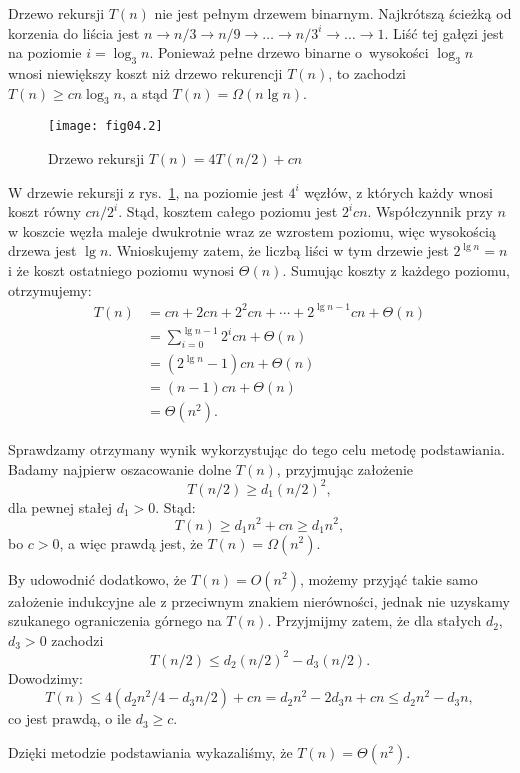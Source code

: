 \exercise{} %
\noindent Drzewo rekursji $T(n)$ nie jest pełnym drzewem binarnym. Najkrótszą ścieżką od korzenia do liścia jest $n\to n/3\to n/9\to\dots\to n/3^i\to\dots\to1$. Liść tej gałęzi jest na poziomie $i=\log_3n$. Ponieważ pełne drzewo binarne o~wysokości $\log_3n$ wnosi niewiększy koszt niż drzewo rekurencji $T(n)$, to zachodzi $T(n)\ge cn\log_3n$, a stąd $T(n)=\Omega(n\lg n)$.

\exercise{} %
\begin{figure}[ht]
	\begin{center}
		\texttt{[image: fig04.2]}
	\end{center}
	\caption{Drzewo rekursji $T(n)=4T(n/2)+cn$} \label{fig:4.2-3}
\end{figure}

\noindent W drzewie rekursji z rys.~\ref{fig:4.2-3}, na  poziomie jest $4^i$ węzłów, z których każdy wnosi koszt równy $cn/2^i$. Stąd, kosztem całego poziomu jest $2^icn$. Współczynnik przy $n$ w koszcie węzła maleje dwukrotnie wraz ze wzrostem poziomu, więc wysokością drzewa jest $\lg n$. Wnioskujemy zatem, że liczbą liści w tym drzewie jest $2^{\lg n}=n$ i że koszt ostatniego poziomu wynosi $\Theta(n)$. Sumując koszty z każdego poziomu, otrzymujemy:
\begin{align*}
	T(n) &= cn+2cn+2^2cn+\cdots+2^{\lg n-1}cn+\Theta(n) \\
	&= \sum_{i=0}^{\lg n-1}2^icn+\Theta(n) \\
	&= (2^{\lg n}-1)cn+\Theta(n) \\
	&= (n-1)cn+\Theta(n) \\
	&= \Theta(n^2).
\end{align*}

Sprawdzamy otrzymany wynik wykorzystując do tego celu metodę podstawiania. Badamy najpierw oszacowanie dolne $T(n)$, przyjmując założenie
\[
	T(n/2) \ge d_1(n/2)^2,
\]
dla pewnej stałej $d_1>0$. Stąd:
\[
	T(n) \ge d_1n^2+cn \ge d_1n^2, 
\]
bo $c>0$, a więc prawdą jest, że $T(n)=\Omega(n^2)$.

By udowodnić dodatkowo, że $T(n)=O(n^2)$, możemy przyjąć takie samo założenie indukcyjne ale z przeciwnym znakiem nierówności, jednak nie uzyskamy szukanego ograniczenia górnego na $T(n)$. Przyjmijmy zatem, że dla stałych $d_2$,~$d_3>0$ zachodzi
\[
	T(n/2) \le d_2(n/2)^2-d_3(n/2).
\]
Dowodzimy:
\[
	T(n) \le 4(d_2n^2\!/4-d_3n/2)+cn = d_2n^2-2d_3n+cn \le d_2n^2-d_3n,
\]
co jest prawdą, o ile $d_3\ge c$.

Dzięki metodzie podstawiania wykazaliśmy, że $T(n)=\Theta(n^2)$.

